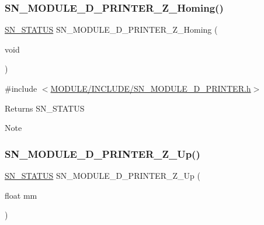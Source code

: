 \subsubsection{\texorpdfstring{S\+N\+\_\+\+M\+O\+D\+U\+L\+E\+\_\+D\+\_\+\+P\+R\+I\+N\+T\+E\+R\+\_\+\+Z\+\_\+\+Homing()}{SN\_MODULE\_3D\_PRINTER\_Z\_Homing()}}
{\footnotesize\ttfamily \hyperlink{group__SYSTEM__ERROR_ga4540713b9a7a18ce44d78c3a10f7442f}{S\+N\+\_\+\+S\+T\+A\+T\+US} S\+N\+\_\+\+M\+O\+D\+U\+L\+E\+\_\+D\+\_\+\+P\+R\+I\+N\+T\+E\+R\+\_\+\+Z\+\_\+\+Homing (\begin{DoxyParamCaption}\item[{void}]{ }\end{DoxyParamCaption})}



{\ttfamily \#include $<$\hyperlink{SN__MODULE__3D__PRINTER_8h}{M\+O\+D\+U\+L\+E/\+I\+N\+C\+L\+U\+D\+E/\+S\+N\+\_\+\+M\+O\+D\+U\+L\+E\+\_\+D\+\_\+\+P\+R\+I\+N\+T\+E\+R.\+h}$>$}

\begin{DoxyReturn}{Returns}
S\+N\+\_\+\+S\+T\+A\+T\+US
\end{DoxyReturn}
\begin{DoxyNote}{Note}

\end{DoxyNote}
\mbox{\label{group__MODULE__3D__PRINTER_ga47326e9f9d52dae584ee7c12011efc64}} 
\subsubsection{\texorpdfstring{S\+N\+\_\+\+M\+O\+D\+U\+L\+E\+\_\+D\+\_\+\+P\+R\+I\+N\+T\+E\+R\+\_\+\+Z\+\_\+\+Up()}{SN\_MODULE\_3D\_PRINTER\_Z\_Up()}}
{\footnotesize\ttfamily \hyperlink{group__SYSTEM__ERROR_ga4540713b9a7a18ce44d78c3a10f7442f}{S\+N\+\_\+\+S\+T\+A\+T\+US} S\+N\+\_\+\+M\+O\+D\+U\+L\+E\+\_\+D\+\_\+\+P\+R\+I\+N\+T\+E\+R\+\_\+\+Z\+\_\+\+Up (\begin{DoxyParamCaption}\item[{float}]{mm }\end{DoxyParamCaption})}




